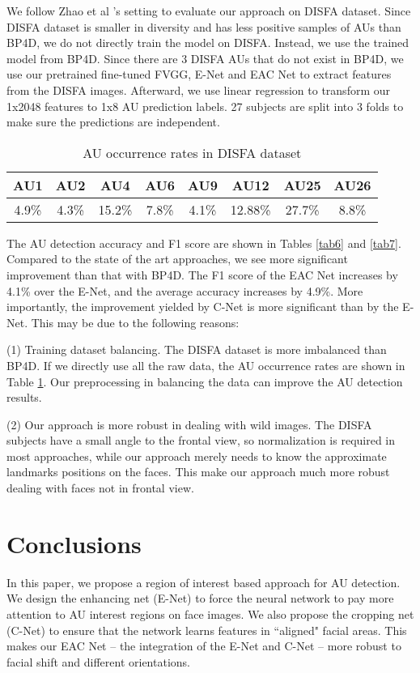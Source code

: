 \documentclass[a4paper, 10pt, conference]{ieeeconf}      %
\begin{document}
We follow Zhao et al \cite{p22}'s setting to evaluate our approach on DISFA dataset. Since DISFA dataset is smaller in diversity and has less positive samples of AUs than BP4D, we do not directly train the model on DISFA. Instead, we use the trained model from BP4D. Since there are 3 DISFA AUs that do not exist in BP4D, we use our pretrained fine-tuned FVGG, {\color {black} E-Net and EAC Net to extract features from the DISFA images. Afterward, we use linear regression to transform our 1x2048 features to 1x8 AU prediction labels.} 27 subjects are split into 3 folds to make sure the predictions are independent.
\begin{table}
\caption{AU occurrence rates in DISFA dataset}
\label{tab8}
\begin{center}
\begin{tabular}{|c|c|c|c|c|c|c|c|}
\hline
AU1&AU2&AU4&AU6&AU9&AU12&AU25&AU26\\
\hline
4.9\%&4.3\%&15.2\%&7.8\%&4.1\%&12.88\%&27.7\%&8.8\%\\
\hline
\end{tabular}
\end{center}
\end{table}
The AU detection accuracy and F1 score are shown in Tables \ref{tab6} and \ref{tab7}. Compared to the state of the art approaches, we see more significant improvement than that with BP4D. The F1 score of the EAC Net increases by 4.1\% over the E-Net, and the average accuracy increases by 4.9\%. More importantly, the improvement yielded by C-Net is more significant than by the E-Net. This may be due to the following reasons:

(1) Training dataset balancing. The DISFA dataset is more imbalanced than BP4D. If we directly use all the raw data, the AU occurrence rates are shown in Table \ref{tab8}. Our preprocessing in balancing the data can improve the AU detection results.

(2) Our approach is more robust in dealing with wild images. The DISFA subjects have a small angle to the frontal view, so normalization is required in most approaches, while our approach merely needs to know the approximate landmarks positions on the faces. This make our approach much more robust dealing with faces not in frontal view.  

\section{Conclusions}

In this paper, we propose a region of interest based approach for AU detection. We design the enhancing net (E-Net) to force the neural network to pay more attention to AU interest regions on face images. We also propose the cropping net (C-Net) to ensure that the network learns features in ``aligned" facial areas. This makes our EAC Net -- the integration of the E-Net and C-Net -- more robust to facial shift and different orientations. 
\end{document}

